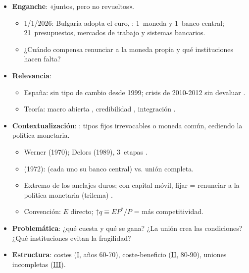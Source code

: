 \documentclass{article}
\begin{document}
\cabecerarepaso
\begin{columnas}

\begin{itemize}
\item \textbf{Enganche}: «juntos, pero no revueltos».
  \begin{itemize}
  \item 1/1/2026: Bulgaria adopta el euro, : 1~moneda y 1~banco central; 21~presupuestos, mercados de trabajo y sistemas bancarios.
  \item ¿Cuándo compensa renunciar a la moneda propia y qué instituciones hacen falta?
  \end{itemize}
\item \textbf{Relevancia}:
  \begin{itemize}
  \item España: sin tipo de cambio desde 1999; crisis de 2010-2012 sin devaluar .
  \item Teoría: macro abierta , credibilidad , integración .
  \end{itemize}
\item \textbf{Contextualización}: : tipos fijos irrevocables o moneda común, cediendo la política monetaria.
  \begin{itemize}
  \item Werner (1970); Delors (1989), 3~etapas .
  \item {} (1972):  (cada uno su banco central) vs. unión completa.
  \item Extremo de los anclajes duros; con capital móvil, fijar = renunciar a la política monetaria (trilema) .
  \item Convención: $E$ directo; ↑$q\equiv EP^*/P$ = más competitividad.
  \end{itemize}
\item \textbf{Problemática}: ¿qué cuesta y qué se gana? ¿La unión crea las condiciones? ¿Qué instituciones evitan la fragilidad?
\item \textbf{Estructura}: costes (\hyperref[rep:I]{I}, años 60-70), coste-beneficio (\hyperref[rep:II]{II}, 80-90), uniones incompletas (\hyperref[rep:III]{III}).
\end{itemize}


\end{columnas}
\end{document}

